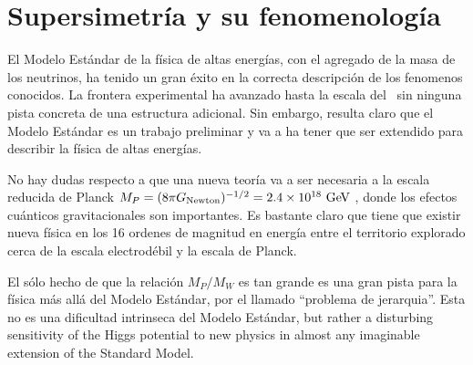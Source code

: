 \chapter{Supersimetría y su fenomenología} %






El Modelo Est\'andar de la f\'isica de altas energ\'ias, con el agregado de la masa de los neutrinos,
ha tenido un gran \'exito en la correcta descripci\'on de los fenomenos conocidos.
La frontera experimental ha avanzado hasta la escala del \tev\ sin ninguna pista concreta de una
estructura adicional.
Sin embargo, resulta claro que el Modelo Est\'andar es un trabajo preliminar y va a ha tener que ser
extendido para describir la f\'isica de altas energ\'ias.

No hay dudas respecto a que una nueva teor\'ia va a ser necesaria a la escala reducida de Planck
$M_P =  (8\pi G_\text{Newton})^{-1/2} = 2.4 \times 10^{18} \gev$ , donde los efectos cu\'anticos
gravitacionales son importantes. Es bastante claro que tiene que existir nueva f\'isica en los 16
ordenes de magnitud en energ\'ia entre el territorio explorado cerca de la escala electrod\'ebil y
la escala de Planck.

El s\'olo hecho de que la relaci\'on $M_P/M_W$ es tan grande es una gran pista para la f\'isica m\'as
all\'a del Modelo Est\'andar, por el llamado ``problema de jerarquia''. Esta no es una dificultad
intrinseca del Modelo Est\'andar,  but rather a disturbing sensitivity of the Higgs
potential to new physics in almost any imaginable extension of the Standard Model.

